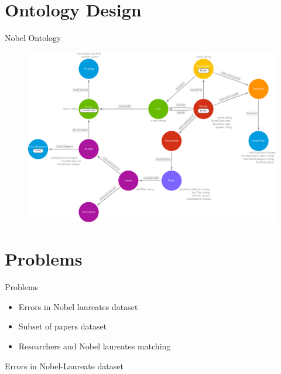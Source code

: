 \documentclass[aspectratio=169,xcolor=dvipsnames]{beamer}
\begin{document}
\section{Ontology Design}

\begin{frame}{Nobel Ontology}
	\begin{figure}
		\includegraphics[width=0.75\linewidth]{../nobelOntologyTransparent.png}
	\end{figure}
\end{frame}

\section{Problems}

\begin{frame}{Problems}
	\begin{itemize}
		\item Errors in Nobel laureates dataset
		\item Subset of papers dataset
		\item Researchers and Nobel laureates matching
	\end{itemize}
\end{frame}

\begin{frame}{Errors in Nobel-Laureate dataset}
	\begin{table}[H]
		\centering
		\caption{Example of dataset error}
		\label{tab:datasetError}
	\end{table}
\end{frame}
\end{document}
